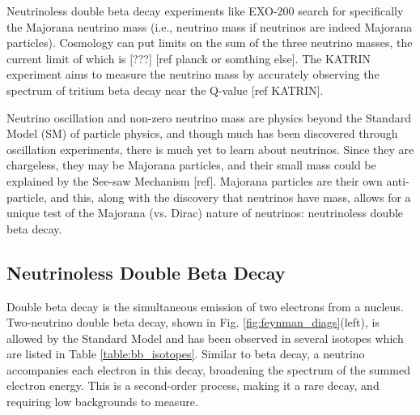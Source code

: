 Neutrinoless double beta decay experiments like EXO-200 search for specifically the Majorana neutrino mass (i.e., neutrino mass if neutrinos are indeed Majorana particles).  Cosmology can put limits on the sum of the three neutrino masses, the current limit of which is [???] [ref planck or somthing else].  The KATRIN experiment aims to measure the neutrino mass by accurately observing the spectrum of tritium beta decay near the Q-value [ref KATRIN].

Neutrino oscillation and non-zero neutrino mass are physics beyond the Standard Model (SM) of particle physics, and though much has been discovered through oscillation experiments, there is much yet to learn about neutrinos. Since they are chargeless, they may be Majorana particles, and their small mass could be explained by the See-saw Mechanism [ref]. Majorana particles are their own anti-particle, and this, along with the discovery that neutrinos have mass, allows for a unique test of the Majorana (vs. Dirac) nature of neutrinos: neutrinoless double beta decay.

\subsection{Neutrinoless Double Beta Decay}

Double beta decay is the simultaneous emission of two electrons from a nucleus.  Two-neutrino double beta decay, shown in Fig. \ref{fig:feynman_diags}(left), is allowed by the Standard Model and has been observed in several isotopes which are listed in Table \ref{table:bb_isotopes}.  Similar to beta decay, a neutrino accompanies each electron in this decay, broadening the spectrum of the summed electron energy. This is a second-order process, making it a rare decay, and requiring low backgrounds to measure.

